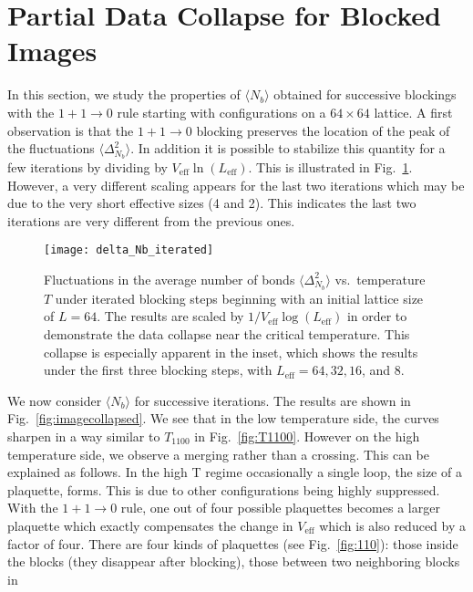 \documentclass[../main.tex]{subfiles}
\begin{document}
\section{Partial Data Collapse for Blocked Images}%
\label{sec:collapse}
In this section, we study the properties of $\langle N_b\rangle$  obtained for
successive blockings with the $1+1\rightarrow0$ rule starting with
configurations on a $64\times64$ lattice.
%
A first observation is that the $1+1\rightarrow0$ blocking preserves the
location of the peak of the fluctuations $\langle\Delta_{N_b}^2\rangle$.
%
 In addition it is possible to stabilize this quantity for a few iterations by
dividing by $V_{\mathrm{eff}}\ln(L_{\mathrm{eff}})$.
%
This is illustrated in Fig.~\ref{fig:delta_Nb_iterated}.
%
However, a very different scaling appears for the last two iterations which may
be due to the very short effective sizes (4 and 2).
%
This indicates the last two iterations are very different from the previous
ones. 
%
\begin{figure}[htpb]
    \centering
    \texttt{[image: delta\_Nb\_iterated]}\hfill
    \caption{Fluctuations in the average number of bonds $\langle
      \Delta_{N_b}^2\rangle$ vs.\ temperature $T$ under iterated blocking steps
      beginning with an initial lattice size of $L = 64$. The results are
      scaled by $1 / V_{\mathrm{eff}}\log(L_{\mathrm{eff}})$ in order to
      demonstrate the data collapse near the critical temperature. This
      collapse is especially apparent in the inset, which shows the results
      under the first three blocking steps, with $L_{\mathrm{eff}} = 64, 32,
      16$, and $8$.}%
\label{fig:delta_Nb_iterated}
\end{figure}
%
We now consider $\langle N_b\rangle$ for successive iterations.
%
The results are shown in Fig.~\ref{fig:imagecollapsed}.
%
We see that in the low temperature side, the curves sharpen in a way similar to
$T_{1100}$ in Fig.~\ref{fig:T1100}.
%
However on the high temperature side, we observe a merging rather than a
crossing.
%
This can be explained as follows.
%
In the high T regime occasionally a single loop, the size of a plaquette,
forms.
%
This is due to other configurations being highly suppressed.
%
With the $1+1\rightarrow0$ rule, one out of four possible plaquettes becomes a
larger plaquette which exactly compensates the change in $V_{\mathrm{eff}}$
which is also reduced by a factor of four.
%
There are four kinds of plaquettes (see Fig.~\ref{fig:110}): those inside the
blocks (they disappear after blocking), those between two neighboring blocks in
\end{document}
